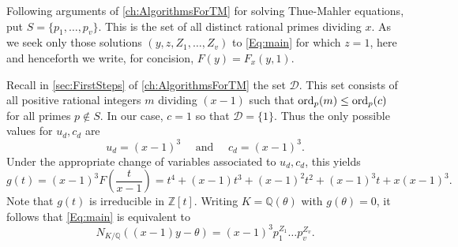 Following arguments of \autoref{ch:AlgorithmsForTM} for solving  Thue-Mahler equations, put $S = \{p_1, \dots, p_v\}$. This is the set of all distinct rational primes dividing $x$. As we seek only those solutions $(y,z, Z_1, \dots, Z_v)$ to \eqref{Eq:main} for which $z = 1$, here and henceforth we write, for concision, $F(y)=F_x(y,1)$. 

Recall in  \autoref{sec:FirstSteps} of \autoref{ch:AlgorithmsForTM} the set $\mathcal{D}$. This set consists of all positive rational integers $m$ dividing $(x-1)$ such that $\operatorname{ord}_{p}(m) \leq \operatorname{ord}_p(c)$ for all primes $p \notin S$. In our case, $c = 1$ so that $\mathcal{D} = \{1\}$. Thus the only possible values for $u_d,c_d$ are
\[u_d = (x-1)^{3} \quad \text{ and } \quad c_d = (x-1)^3.\]
Under the appropriate change of variables associated to $u_d,c_d$, this yields
$$
g(t) = (x-1)^3F\left(\frac{t}{x-1}\right) = t^4 + (x-1)t^3 + (x-1)^2t^2 + (x-1)^3t + x(x-1)^3.
$$
Note that $g(t)$ is irreducible in $\mathbb{Z}[t]$. Writing $K = \mathbb{Q}(\theta)$ with $g(\theta) = 0$, it follows that
 \eqref{Eq:main} is equivalent to
\begin{equation} \label{Eq:norm}
N_{K/\mathbb{Q}}((x-1)y-\theta) =  (x-1)^{3}p_1^{Z_1}\dots p_v^{Z_v}.
\end{equation}

